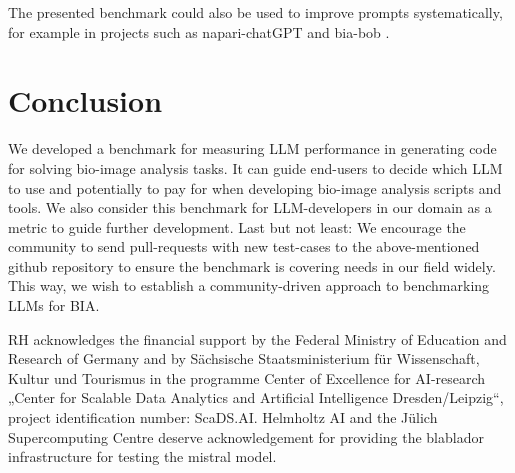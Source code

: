 \documentclass{ecai}
\begin{document}
\begin{blind}
The presented benchmark could also be used to improve prompts systematically, for example in projects such as napari-chatGPT \citep{royer2023omega} and bia-bob \citep{haase2024biaBob}.
\end{blind} 


\section{Conclusion}

We developed a benchmark for measuring LLM performance in generating code for solving bio-image analysis tasks. It can guide end-users to decide which LLM to use and potentially to pay for when developing bio-image analysis scripts and tools. We also consider this benchmark for LLM-developers in our domain as a metric to guide further development. Last but not least: We encourage the community to send pull-requests with new test-cases to the above-mentioned github repository to ensure the benchmark is covering needs in our field widely. This way, we wish to establish a community-driven approach to benchmarking LLMs for BIA. 




\begin{ack}
RH acknowledges the financial support by the Federal Ministry of Education and Research of Germany and by Sächsische Staatsministerium für Wissenschaft, Kultur und Tourismus in the programme Center of Excellence for AI-research „Center for Scalable Data Analytics and Artificial Intelligence Dresden/Leipzig“, project identification number: ScaDS.AI.
Helmholtz AI and the Jülich Supercomputing Centre deserve acknowledgement for providing the blablador infrastructure for testing the mistral model.

\end{ack}




\end{document}
